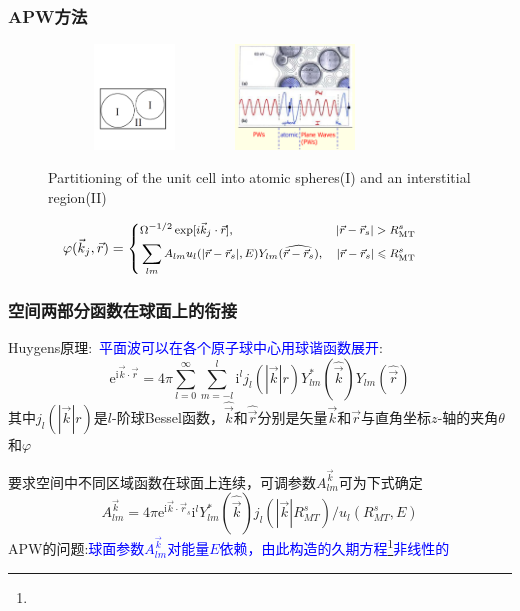 \frame
{
\frametitle{\textrm{APW}方法}
\begin{figure}[h!]
\centering
\includegraphics[height=1.10in,width=1.80in,viewport=40 150 545 465,clip]{Figures/Muffin_tin.pdf}
\includegraphics[height=1.10in,width=1.45in,viewport=1 20 485 435,clip]{Figures/APW.png}
\caption{\tiny \textrm{Partitioning of the unit cell into atomic spheres(I) and an interstitial region(II)}}%
\label{Muffin_tin-2}
\end{figure}
\begin{displaymath}
\hskip -28pt\footnotesize \varphi(\vec k_j,\vec r)=\left\{
  \begin{aligned}
    &\Omega^{-1/2}\exp[i\vec k_j\cdot\vec r],&|\vec r-\vec r_s|>R_{\mathrm{MT}}^s\\
    &\sum_{lm}A_{lm}u_l(|\vec r-\vec r_s|,E)Y_{lm}(\widehat{\vec r-\vec r_s}),&|\vec r-\vec r_s|\leqslant R_{\mathrm{MT}}^s
  \end{aligned}
\right.
\end{displaymath}
}

\frame
{
	\frametitle{空间两部分函数在球面上的衔接}
	\textrm{Huygens}原理:~\textcolor{blue}{平面波可以在各个原子球中心用球谐函数展开}:
	\begin{displaymath}
		\mathrm{e}^{\mathrm{i}\vec k\cdot\vec r}=4\pi\sum_{l=0}^{\infty}\sum_{m=-l}^l\mathrm{i}^lj_l(|\vec k|r)Y_{lm}^{\ast}(\hat{\vec k})Y_{lm}(\hat{\vec r})
	\end{displaymath}
	其中$j_l(|\vec k|r)$是$l$-阶球\textrm{Bessel}函数，$\hat{\vec k}$和$\hat{\vec r}$分别是矢量$\vec k$和$\vec r$与直角坐标$z$-轴的夹角$\theta$和$\varphi$

	要求空间中不同区域函数在球面上连续，可调参数$A_{lm}^{\vec k}$可为下式确定
\begin{displaymath}
	A_{lm}^{\vec k}=4\pi\mathrm{e}^{\mathrm{i}\vec k\cdot\vec r_s}\mathrm{i}^lY_{lm}^{\ast}(\hat{\vec k})j_l(|\vec k|R_{MT}^s)/u_l(R_{MT}^s,E)
\end{displaymath}
\textrm{APW}的问题:\textcolor{blue}{球面参数$A_{lm}^{\vec k}$对能量$E$依赖，由此构造的久期方程\footnote{\fontsize{7.2pt}{6.2pt}}非线性的}
}

